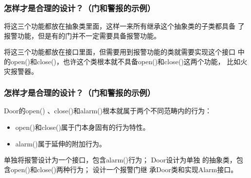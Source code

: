 \begin{frame}[fragile]
  \frametitle{怎样才是合理的设计？（门和警报的示例）}

  
  将这三个功能都放在抽象类里面，这样一来所有继承这个抽象类的子类都具备
  了报警功能，但是有的门并不一定需要具备报警功能。

  \pause
  

  将这三个功能都放在接口里面，但需要用到报警功能的类就需要实现这个接口
  中的open()和close()，也许这个类根本就不具备open()和close()这两个功能，
  比如火灾报警器。

\end{frame}

\begin{frame}[fragile]
  \frametitle{怎样才是合理的设计？（门和警报的示例）}

  Door的open() 、close()和alarm()根本就属于两个不同范畴内的行为：

  \begin{itemize}
  \item open()和close()属于门本身固有的行为特性。
  \item alarm()属于延伸的附加行为。
  \end{itemize}

  \pause
  

   单独将报警设计为一个接口，包含alarm()行为； Door设计为单独
  的抽象类，包含open()和close()两种行为； 设计一个报警门继
  承Door类和实现Alarm接口。

\end{frame}



